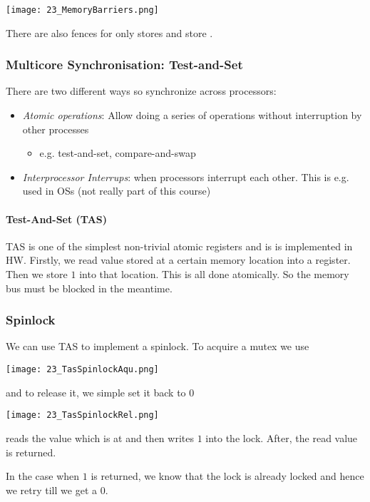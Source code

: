 \texttt{[image: 23\_MemoryBarriers.png]}

There are also fences for only stores  and store .

\subsubsection{Multicore Synchronisation: Test-and-Set}
There are two different ways so synchronize across processors:

\begin{itemize}
    \item \textit{Atomic operations}: Allow doing a series of operations without interruption by other processes
        \begin{itemize}
            \item e.g. test-and-set, compare-and-swap
        \end{itemize}
    \item \textit{Interprocessor Interrups}: when processors interrupt each other. This is e.g. used in OSs (not really part of this course)
\end{itemize}

\paragraph{Test-And-Set (TAS)}
TAS is one of the simplest non-trivial atomic registers and is is implemented in HW. Firstly, we read value stored at a certain memory location into a register. Then we store $1$ into that location. This is all done atomically. So the memory bus must be blocked in the meantime.

\subsubsection{Spinlock}
We can use TAS to implement a spinlock. To acquire a mutex we use

\texttt{[image: 23\_TasSpinlockAqu.png]}

and to release it, we simple set it back to $0$

\texttt{[image: 23\_TasSpinlockRel.png]}

 reads the value which is at  and then writes $1$ into the lock. After, the read value is returned.

In the case when $1$ is returned, we know that the lock is already locked and hence we retry till we get a $0$.

